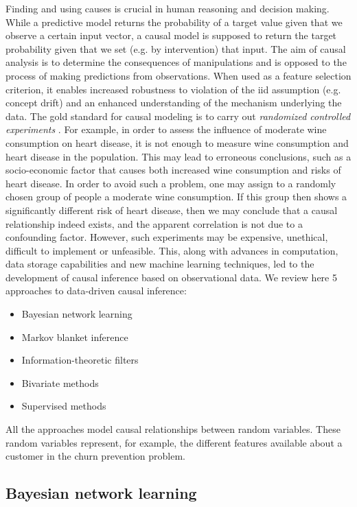 Finding and using causes is crucial in human reasoning and decision making.
While a predictive model returns the probability of a target value given that we
observe a certain input vector, a causal model is supposed to return the target
probability given that we set (e.g. by intervention) that input. The aim of
causal analysis is to determine the consequences of manipulations and is opposed
to the process of making predictions from observations. When used as a feature
selection criterion, it enables increased robustness to violation of the iid
assumption (e.g. concept drift) \parencite{guyon2007causal} and an enhanced
understanding of the mechanism underlying the data. The gold standard for causal
modeling is to carry out  \emph{randomized controlled experiments}
\parencite{fisher1937design}. For example, in order to assess the influence of
moderate wine consumption on heart disease, it is not enough to measure wine
consumption and heart disease in the population. This may lead to erroneous
conclusions, such as a socio-economic factor that causes both increased wine
consumption and risks of heart disease. In order to avoid such a problem, one
may assign to a randomly chosen group of people a moderate wine consumption. If
this group then shows a significantly different risk of heart disease, then we
may conclude that a causal relationship indeed exists, and the apparent
correlation is not due to a confounding factor. However, such experiments may be
expensive, unethical, difficult to implement or unfeasible. This, along with
advances in computation, data storage capabilities and new machine learning
techniques, led to the development of causal inference based on observational
data. We review here 5 approaches to data-driven causal inference:

\begin{itemize}
    \item Bayesian network learning
    \item Markov blanket inference
    \item Information-theoretic filters
    \item Bivariate methods
    \item Supervised methods
\end{itemize}

All the approaches model causal relationships between random variables. These
random variables represent, for example, the different features available about
a customer in the churn prevention problem.

\subsection{Bayesian network learning}

